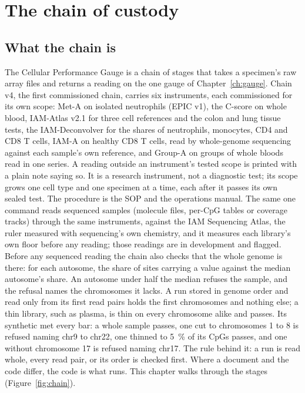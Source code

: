 \chapter{The chain of custody}\label{ch:chain}



\section{What the chain is}

The Cellular Performance Gauge is a chain of stages that takes a specimen's raw array files and returns a reading on the one gauge of
Chapter~\ref{ch:gauge}. Chain v4, the first commissioned chain, carries six instruments, each commissioned for its own scope: Met-A on isolated neutrophils (EPIC v1), the C-score on whole blood, IAM-Atlas v2.1 for three cell references and the colon and lung tissue tests, the IAM-Deconvolver for the shares of neutrophils, monocytes, CD4 and CD8 T cells, IAM-A on healthy CD8 T cells, read by whole-genome sequencing against each sample's own reference, and Group-A on groups of whole bloods read in one series. A reading outside an instrument's tested scope is printed with a plain note saying so. It is a research instrument, not a diagnostic test; its scope grows one cell type and one specimen at a time, each after it passes its own sealed test. The
procedure is the SOP and the operations manual.
The same one command reads sequenced samples (molecule files, per-CpG tables or coverage tracks) through the same instruments, against the IAM Sequencing Atlas, the ruler measured with sequencing's own chemistry, and it measures each library's own floor before any reading; those readings are in development and flagged.
Before any sequenced reading the chain also checks that the whole genome is there: for each autosome, the share of sites carrying a value against the
median autosome's share. An autosome under half the median refuses the sample, and the refusal names the chromosomes it lacks. A run stored in genome
order and read only from its first read pairs holds the first chromosomes and nothing else; a thin library, such as plasma, is thin on every chromosome
alike and passes. Its synthetic met every bar: a whole sample passes, one cut to chromosomes 1 to 8 is refused naming chr9 to chr22, one thinned to
5~\% of its CpGs passes, and one without chromosome 17 is refused naming chr17. The rule behind it: a run is read whole, every read pair, or its order is
checked first.
Where a document and the code differ, the code is what runs. This chapter walks through the stages (Figure~\ref{fig:chain}).

